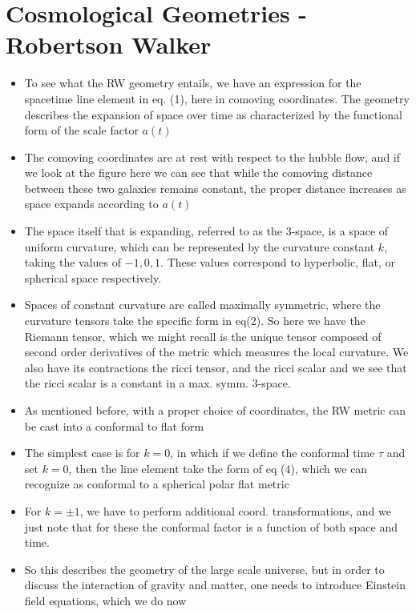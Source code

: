 \documentclass[10pt,letterpaper]{article}
\numberwithin{equation}{section}
\begin{document}
\section{Cosmological Geometries - Robertson Walker}
\begin{itemize}
	\item To see what the RW geometry entails, we have an expression for the spacetime line element in eq. (1), here in comoving coordinates. The geometry describes the expansion of space over time as characterized by the functional form of the scale factor $a(t)$
	\item The comoving coordinates are at rest with respect to the hubble flow, and if we look at the figure here we can see that while the comoving distance between these two galaxies remains constant, the proper distance increases as space expands according to $a(t)$
	\item The space itself that is expanding, referred to as the 3-space, is a space of uniform curvature, which can be represented by the curvature constant $k$, taking the values of $-1, 0, 1 $. These values correspond to hyperbolic, flat, or spherical space respectively.
	\item Spaces of constant curvature are called maximally symmetric, where the curvature tensors take the specific form in eq(2). So here we have the Riemann tensor, which we might recall is the unique tensor composed of second order derivatives of the metric which measures the local curvature. We also have its contractions the ricci tensor, and the ricci scalar and we see that the ricci scalar is a constant in a max. symm. 3-space.
	\item As mentioned before, with a proper choice of coordinates, the RW metric can be cast into a conformal to flat form
	\item The simplest case is for $k=0$, in which if we define the conformal time $\tau$ and set $k=0$, then the line element take the form of eq (4), which we can recognize as conformal to a spherical polar flat metric
	\item For $k=\pm 1$, we have to perform additional coord. transformations, and we just note that for these the conformal factor is a function of both space and time.
	\item So this describes the geometry of the large scale universe, but in order to discuss the interaction of gravity and matter, one needs to introduce Einstein field equations, which we do now
\end{itemize}
\end{document}
